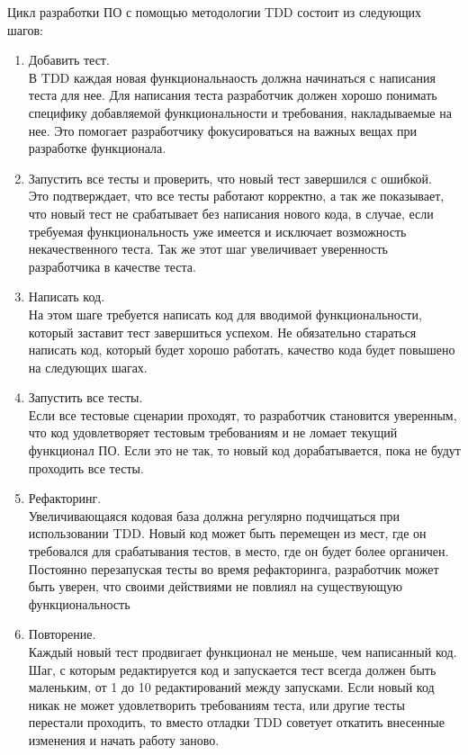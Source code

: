 Цикл разработки ПО с помощью методологии TDD состоит из следующих шагов:
\begin{enumerate}[label={\arabic*)}]
    \item Добавить тест.\\
        В TDD каждая новая функциональнаость должна начинаться с написания теста для нее.
        Для написания теста разработчик должен хорошо понимать специфику добавляемой 
        функциональности и требования, накладываемые на нее. Это помогает разработчику
        фокусироваться на важных вещах при разработке функционала.
    \item Запустить все тесты и проверить, что новый тест завершился с ошибкой.\\
        Это подтверждает, что все тесты работают корректно, а так же показывает,
        что новый тест не срабатывает без написания нового кода, 
        в случае, если требуемая функциональность уже имеется и исключает 
        возможность некачественного теста.
        Так же этот шаг увеличивает уверенность разработчика в качестве теста.
    \item Написать код.\\
        На этом шаге требуется написать код для вводимой функциональности, который
        заставит тест завершиться успехом. Не обязательно стараться написать код, 
        который будет хорошо работать, качество кода будет повышено на следующих
        шагах.
    \item Запустить все тесты.\\
        Если все тестовые сценарии проходят, то разработчик становится уверенным,
        что код удовлетворяет тестовым требованиям и не ломает текущий функционал ПО.
        Если это не так, то новый код дорабатывается, пока не будут проходить все тесты.
    \item Рефакторинг.\\
        Увеличивающаяся кодовая база должна регулярно подчищаться при использовании TDD.
        Новый код может быть перемещен из мест, где он требовался для срабатывания тестов,
        в место, где он будет более органичен. Постоянно перезапуская тесты во время
        рефакторинга, разработчик может быть уверен, что своими действиями не повлиял на 
        существующую функциональность
    \item Повторение.\\
        Каждый новый тест продвигает функционал не меньше, чем написанный код.
        Шаг, с которым редактируется код и запускается тест всегда должен быть
        маленьким, от 1 до 10 редактирований между запусками.
        Если новый код никак не может удовлетворить требованиям теста, или
        другие тесты перестали проходить, то вместо отладки TDD советует откатить
        внесенные изменения и начать работу заново.
\end{enumerate}


